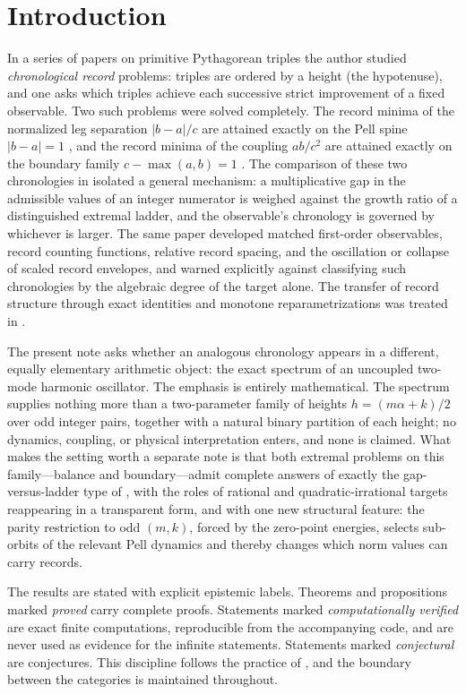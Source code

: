 \documentclass[11pt]{article}
\theoremstyle{definition}
\theoremstyle{remark}
\begin{document}
\section{Introduction}

In a series of papers on primitive Pythagorean triples the author studied \emph{chronological record} problems: triples are ordered by a height (the hypotenuse), and one asks which triples achieve each successive strict improvement of a fixed observable. Two such problems were solved completely. The record minima of the normalized leg separation $|b-a|/c$ are attained exactly on the Pell spine $|b-a|=1$ \cite{pellspine}, and the record minima of the coupling $ab/c^2$ are attained exactly on the boundary family $c-\max(a,b)=1$ \cite{quartercircle}. The comparison of these two chronologies in \cite{quartercircle} isolated a general mechanism: a multiplicative gap in the admissible values of an integer numerator is weighed against the growth ratio of a distinguished extremal ladder, and the observable's chronology is governed by whichever is larger. The same paper developed matched first-order observables, record counting functions, relative record spacing, and the oscillation or collapse of scaled record envelopes, and warned explicitly against classifying such chronologies by the algebraic degree of the target alone. The transfer of record structure through exact identities and monotone reparametrizations was treated in \cite{majorization}.

The present note asks whether an analogous chronology appears in a different, equally elementary arithmetic object: the exact spectrum of an uncoupled two-mode harmonic oscillator. The emphasis is entirely mathematical. The spectrum supplies nothing more than a two-parameter family of heights $h=(m\alpha+k)/2$ over odd integer pairs, together with a natural binary partition of each height; no dynamics, coupling, or physical interpretation enters, and none is claimed. What makes the setting worth a separate note is that both extremal problems on this family---balance and boundary---admit complete answers of exactly the gap-versus-ladder type of \cite{quartercircle,pellspine}, with the roles of rational and quadratic-irrational targets reappearing in a transparent form, and with one new structural feature: the parity restriction to odd $(m,k)$, forced by the zero-point energies, selects sub-orbits of the relevant Pell dynamics and thereby changes which norm values can carry records.

The results are stated with explicit epistemic labels. Theorems and propositions marked \emph{proved} carry complete proofs. Statements marked \emph{computationally verified} are exact finite computations, reproducible from the accompanying code, and are never used as evidence for the infinite statements. Statements marked \emph{conjectural} are conjectures. This discipline follows the practice of \cite{pellspine,quartercircle}, and the boundary between the categories is maintained throughout.
\end{document}
